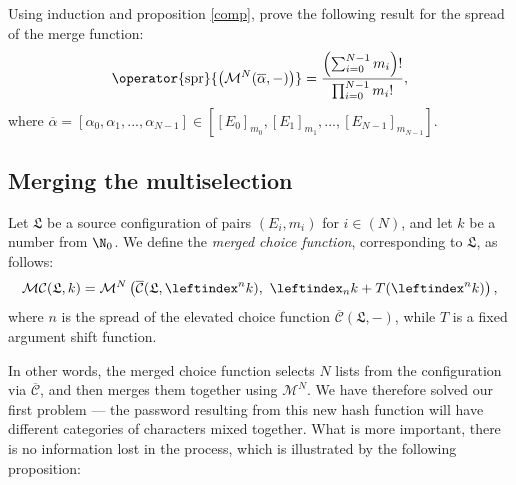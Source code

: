 \documentclass[12pt, a4paper]{article}
\renewcommand{\C}{\mathcal{C}}
\newcommand{\CC}{\overline{\mathcal{C}}}
\newcommand{\M}{\mathcal{M}}
\newcommand{\conf}{\mathfrak{L}}
\newcommand{\spr}[1]{\operator{\mathrm{spr}}{\left(#1\right)}}
\newcommand{\lli}[1]{\leftindex_{#1}}
\newcommand{\lui}[1]{\leftindex^{#1}}
\begin{document}
\begin{exercise}
    Using induction and proposition \ref{comp}, prove the following result for the spread of the merge function:
    \begin{equation}\label{sprm}
        \spr{\M^N(\overline{\alpha}, -)} = \frac{\left( \sum\nolimits_{i = 0}^{N-1} m_i \right)!}{\prod\nolimits_{i = 0}^{N-1} m_i!},\\[2mm]
    \end{equation}
    where $ \overline{\alpha} = [\alpha_0, \alpha_1, ..., \alpha_{N-1}] \in [[E_0]_{m_0}, [E_1]_{m_1}, ..., [E_{N-1}]_{m_{N-1}}] $.
\end{exercise}

\subsection{Merging the multiselection}

\begin{definition}
    Let $ \conf $ be a source configuration of pairs $ (E_i, m_i) $ for $ i \in (N) $, and let $ k $ be a number from $ \N_0 $. We define the \emph{merged choice function}, corresponding to $ \conf $, as follows:
    \[ \M\C(\conf, k) = \M^N\left(\CC(\conf, \lui{n}k),\ \lli{n}k + T(\lui{n}k)\right), \]
    where $ n $ is the spread of the elevated choice function $ \CC(\conf, -) $, while $ T $ is a fixed argument shift function.
\end{definition}

In other words, the merged choice function selects $ N $ lists from the configuration via $ \CC $, and then merges them together using $ \M^N $. We have therefore solved our first problem --- the password resulting from this new hash function will have different categories of characters mixed together. What is more important, there is no information lost in the process, which is illustrated by the following proposition:
\end{document}
